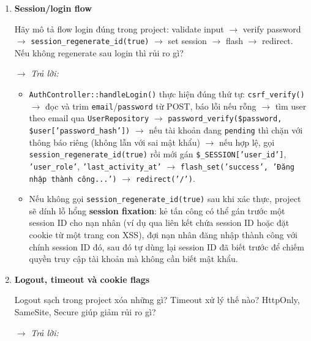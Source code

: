 \begin{enumerate}[label = \textbf{\arabic*.}, leftmargin=*]
    \item \textbf{Session/login flow}

    Hãy mô tả flow login đúng trong project: validate input $\rightarrow$ verify password $\rightarrow$ \texttt{session\_regenerate\_id(true)} $\rightarrow$ set session $\rightarrow$ flash $\rightarrow$ redirect. Nếu không regenerate sau login thì rủi ro gì?

    \hspace*{-0.6cm} $\rightarrow$ \textit{Trả lời:}

    \begin{itemize}[leftmargin = 0.55cm, label = $\bullet$]
        \item \texttt{AuthController::handleLogin()} thực hiện đúng thứ tự: \texttt{csrf\_verify()} $\rightarrow$ đọc và trim \texttt{email}/\texttt{password} từ POST, báo lỗi nếu rỗng $\rightarrow$ tìm user theo email qua \texttt{UserRepository} $\rightarrow$ \texttt{password\_verify(\$password, \$user['password\_hash'])} $\rightarrow$ nếu tài khoản đang \texttt{pending} thì chặn với thông báo riêng (không lẫn với sai mật khẩu) $\rightarrow$ nếu hợp lệ, gọi \texttt{session\_regenerate\_id(true)} rồi mới gán \texttt{\$\_SESSION['user\_id']}, \texttt{'user\_role'}, \texttt{'last\_activity\_at'} $\rightarrow$ \texttt{flash\_set('success', 'Đăng nhập thành công...')} $\rightarrow$ \texttt{redirect('/')}.
        \item Nếu không gọi \texttt{session\_regenerate\_id(true)} sau khi xác thực, project sẽ dính lỗ hổng \textbf{session fixation}: kẻ tấn công có thể gán trước một session ID cho nạn nhân (ví dụ qua liên kết chứa session ID hoặc đặt cookie từ một trang con XSS), đợi nạn nhân đăng nhập thành công với chính session ID đó, sau đó tự dùng lại session ID đã biết trước để chiếm quyền truy cập tài khoản mà không cần biết mật khẩu.
    \end{itemize}

    \item \textbf{Logout, timeout và cookie flags}

    Logout sạch trong project xóa những gì? Timeout xử lý thế nào? HttpOnly, SameSite, Secure giúp giảm rủi ro gì?

    \hspace*{-0.6cm} $\rightarrow$ \textit{Trả lời:}


\end{enumerate}
